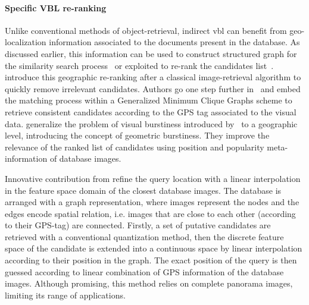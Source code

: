 \paragraph{Specific VBL re-ranking}            
Unlike conventional methods of object-retrieval, indirect \ac{vbl} can benefit from geo-localization information associated to the documents present in the database. As discussed earlier, this information can be used to construct structured graph for the similarity search process~\citep{Torii2011,Cao2013} or exploited to re-rank the candidates list~\citep{Zamir2010,Zamir2014,Sattler2016}. \citet{Zamir2010} introduce this geographic re-ranking after a classical image-retrieval algorithm to quickly remove irrelevant candidates. Authors go one step further in~\citep{Zamir2014} and embed the matching process within a Generalized Minimum Clique Graphs scheme to retrieve consistent candidates according to the GPS tag associated to the visual data. \citet{Sattler2016} generalize the problem of visual burstiness introduced by~\citep{Jegou2009} to a geographic level, introducing the concept of geometric burstiness. They improve the relevance of the ranked list of candidates using position and popularity meta-information of database images.

Innovative contribution from \citet{Torii2011} refine the query location with a linear interpolation in the feature space domain of the closest database images. The database is arranged with a graph representation, where images represent the nodes and the edges encode spatial relation, i.e. images that are close to each other (according to their GPS-tag) are connected. Firstly, a set of putative candidates are retrieved with a conventional quantization method, then the discrete feature space of the candidate is extended into a continuous space by linear interpolation according to their position in the graph. The exact position of the query is then guessed according to linear combination of GPS information of the database images. Although promising, this method relies on complete panorama images, limiting its range of applications.

